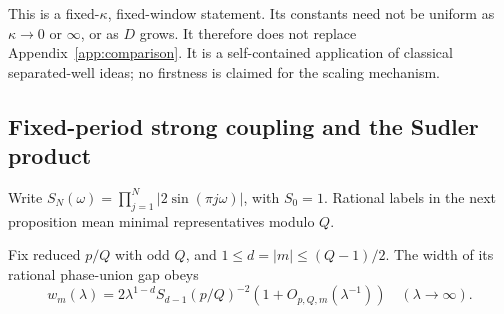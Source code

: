 This is a fixed-$\kappa$, fixed-window statement. Its constants need not be uniform as $\kappa\to0$ or $\infty$, or as $D$ grows. It therefore does not replace Appendix~\ref{app:comparison}. It is a self-contained application of classical separated-well ideas; no firstness is claimed for the scaling mechanism.

\subsection{Fixed-period strong coupling and the Sudler product}
Write $S_N(\omega)=\prod_{j=1}^N|2\sin(\pi j\omega)|$, with $S_0=1$. Rational labels in the next proposition mean minimal representatives modulo $Q$.

\begin{inputbox}
\begin{classicalproposition}
Fix reduced $p/Q$ with odd $Q$, and $1\le d=|m|\le(Q-1)/2$. The width of its rational phase-union gap obeys
\begin{equation}\label{eq:Sudler}
 w_m(\lambda)=2\lambda^{1-d}S_{d-1}(p/Q)^{-2}
                         (1+O_{p,Q,m}(\lambda^{-1}))
 \quad(\lambda\to\infty).
\end{equation}
\end{classicalproposition}
\end{inputbox}
